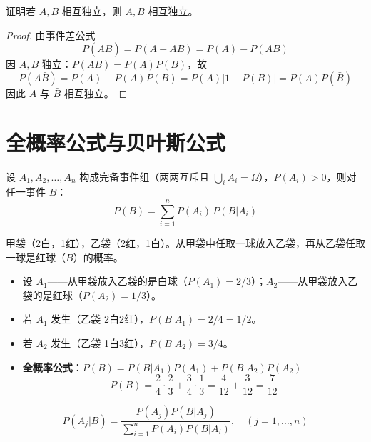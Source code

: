 \begin{example}[独立性的性质]
证明若 $A, B$ 相互独立，则 $A, \bar{B}$ 相互独立。
\end{example}
\begin{proof}
	由事件差公式
	\begin{equation}
		P(A\bar{B}) = P(A - AB) = P(A) - P(AB)
		\label{eq:第一章:独立性证明1}
	\end{equation}
	因 $A, B$ 独立：$P(AB) = P(A)P(B)$，故
	\begin{equation}
		P(A\bar{B}) = P(A) - P(A)P(B) = P(A)\big[1 - P(B)\big] = P(A)P(\bar{B})
		\label{eq:第一章:独立性证明2}
	\end{equation}
	因此 $A$ 与 $\bar{B}$ 相互独立。
\end{proof}

\section{全概率公式与贝叶斯公式}
\begin{theorem}[全概率公式]
设 $A_1, A_2, \ldots, A_n$ 构成完备事件组（两两互斥且 $\bigcup_i A_i = \Omega$），$P(A_i) > 0$，则对任一事件 $B$：
\begin{equation}
	P(B) = \sum_{i=1}^{n} P(A_i)\,P(B|A_i)
	\label{eq:第一章:全概率公式}
\end{equation}
\end{theorem}

\begin{example}
甲袋（2白，1红），乙袋（2红，1白）。从甲袋中任取一球放入乙袋，再从乙袋任取一球是红球（$B$）的概率。
\begin{itemize}
	\item 设 $A_1$——从甲袋放入乙袋的是白球（$P(A_1) = 2/3$）；$A_2$——从甲袋放入乙袋的是红球（$P(A_2) = 1/3$）。
	\item 若 $A_1$ 发生（乙袋 2白2红），$P(B|A_1) = 2/4 = 1/2$。
	\item 若 $A_2$ 发生（乙袋 1白3红），$P(B|A_2) = 3/4$。
	\item \textbf{全概率公式}：$P(B) = P(B|A_1)P(A_1) + P(B|A_2)P(A_2)$
	\begin{equation}
		P(B) = \frac{2}{4} \cdot \frac{2}{3} + \frac{3}{4} \cdot \frac{1}{3} = \frac{4}{12} + \frac{3}{12} = \frac{7}{12}
		\label{eq:第一章:全概率例题}
	\end{equation}
\end{itemize}
\end{example}

\begin{theorem}[贝叶斯公式]
\begin{equation}
	P(A_j|B) = \frac{P(A_j)P(B|A_j)}{\sum_{i=1}^{n} P(A_i)P(B|A_i)}, \quad (j=1,\dots,n)
	\label{eq:第一章:贝叶斯公式}
\end{equation}
\end{theorem}

